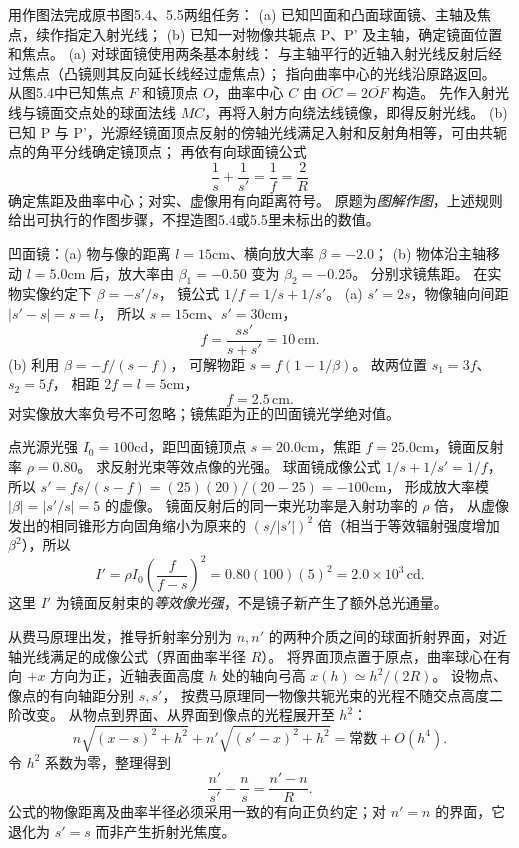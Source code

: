 用作图法完成原书图5.4、5.5两组任务：
(a) 已知凹面和凸面球面镜、主轴及焦点，续作指定入射光线；
(b) 已知一对物像共轭点 P、P' 及主轴，确定镜面位置和焦点。
\exsolution
(a) 对球面镜使用两条基本射线：
与主轴平行的近轴入射光线反射后经过焦点（凸镜则其反向延长线经过虚焦点）；
指向曲率中心的光线沿原路返回。
从图5.4中已知焦点 $F$ 和镜顶点 $O$，曲率中心 $C$ 由
$\overline{OC}=2\overline{OF}$ 构造。
先作入射光线与镜面交点处的球面法线 $MC$，再将入射方向绕法线镜像，即得反射光线。
(b) 已知 P 与 P'，光源经镜面顶点反射的傍轴光线满足入射和反射角相等，可由共轭点的角平分线确定镜顶点；
再依有向球面镜公式
\[
\boxed{\frac1s+\frac1{s'}=\frac1f=\frac2R}
\]
确定焦距及曲率中心；对实、虚像用有向距离符号。
\excheck 原题为\emph{图解作图}，上述规则给出可执行的作图步骤，不捏造图5.4或5.5里未标出的数值。

凹面镜：(a) 物与像的距离 $l=15$cm、横向放大率
$\beta=-2.0$；
(b) 物体沿主轴移动 $l=5.0$cm 后，放大率由
$\beta_1=-0.50$ 变为 $\beta_2=-0.25$。
分别求镜焦距。
\exsolution
在实物实像约定下
$\beta=-s'/s$，
镜公式 $1/f=1/s+1/s'$。
(a) $s'=2s$，物像轴向间距
$|s'-s|=s=l$，
所以 $s=15$cm、$s'=30$cm，
\[
\boxed{f=\frac{ss'}{s+s'}=10\,\mathrm{cm}}.
\]
(b) 利用
$\beta=-f/(s-f)$，
可解物距
$s=f(1-1/\beta)$。
故两位置
$s_1=3f$、$s_2=5f$，
相距 $2f=l=5$cm，
\[
\boxed{f=2.5\,\mathrm{cm}}.
\]
\excheck 对实像放大率负号不可忽略；镜焦距为正的凹面镜光学绝对值。

点光源光强 $I_0=100$cd，距凹面镜顶点
$s=20.0$cm，焦距 $f=25.0$cm，镜面反射率
$\rho=0.80$。
求反射光束等效点像的光强。
\exsolution
球面镜成像公式
$1/s+1/s'=1/f$，
所以
$s'=fs/(s-f)
=(25)(20)/(20-25)=-100$cm，
形成放大率模
$|\beta|=|s'/s|=5$ 的虚像。
镜面反射后的同一束光功率是入射功率的 $\rho$ 倍，
从虚像发出的相同锥形方向固角缩小为原来的
$(s/|s'|)^2$ 倍（相当于等效辐射强度增加 $\beta^2$），所以
\[
\boxed{I'=\rho I_0
\left(\frac{f}{f-s}\right)^2
=0.80(100)(5)^2
=2.0\times10^3\,\mathrm{cd}}.
\]
\excheck 这里 $I'$ 为镜面反射束的\emph{等效像光强}，不是镜子新产生了额外总光通量。

从费马原理出发，推导折射率分别为
$n,n'$ 的两种介质之间的球面折射界面，对近轴光线满足的成像公式（界面曲率半径 $R$）。
\exsolution
将界面顶点置于原点，曲率球心在有向 $+x$ 方向为正，近轴表面高度 $h$ 处的轴向弓高
$x(h)\simeq h^2/(2R)$。
设物点、像点的有向轴距分别 $s,s'$，
按费马原理同一物像共轭光束的光程不随交点高度二阶改变。
从物点到界面、从界面到像点的光程展开至 $h^2$：
\[
n\sqrt{(x-s)^2+h^2}
+n'\sqrt{(s'-x)^2+h^2}
=\text{常数}+O(h^4).
\]
令 $h^2$ 系数为零，整理得到
\[
\boxed{\frac{n'}{s'}-\frac n{s}
=\frac{n'-n}{R}}.
\]
\excheck 公式的物像距离及曲率半径必须采用一致的有向正负约定；对 $n'=n$ 的界面，它退化为 $s'=s$ 而非产生折射光焦度。

